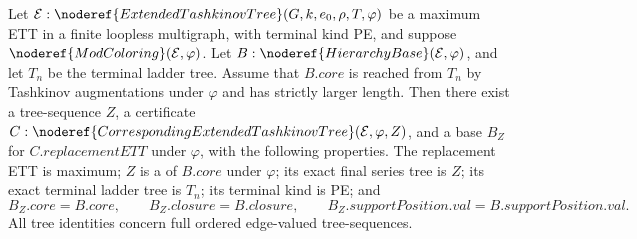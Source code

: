 \begin{lemma}
Let \(\mathcal E:\noderef{ExtendedTashkinovTree}(G,k,e_0,\rho,T,\varphi)\)
be a maximum ETT in a finite loopless multigraph, with terminal kind PE,
and suppose \(\noderef{ModColoring}(\mathcal E,\varphi)\).
Let \(B:\noderef{HierarchyBase}(\mathcal E,\varphi)\), and let \(T_n\)
be the terminal ladder tree. Assume that \(B.\mathit{core}\) is reached from
\(T_n\) by Tashkinov augmentations under \(\varphi\) and has strictly larger
length. Then there exist a tree-sequence \(Z\), a certificate
\(C:\noderef{CorrespondingExtendedTashkinovTree}(\mathcal E,\varphi,Z)\),
and a base \(B_Z\) for \(C.\mathit{replacementETT}\) under \(\varphi\),
with the following properties. The replacement ETT is maximum; \(Z\) is a
 of \(B.\mathit{core}\) under \(\varphi\);
its exact final series tree is \(Z\); its exact terminal ladder tree is
\(T_n\); its terminal kind is PE; and
\[
 B_Z.\mathit{core}=B.\mathit{core},\qquad
 B_Z.\mathit{closure}=B.\mathit{closure},\qquad
 B_Z.\mathit{supportPosition.val}=B.\mathit{supportPosition.val}.
\]
All tree identities concern full ordered edge-valued tree-sequences.
\end{lemma}
